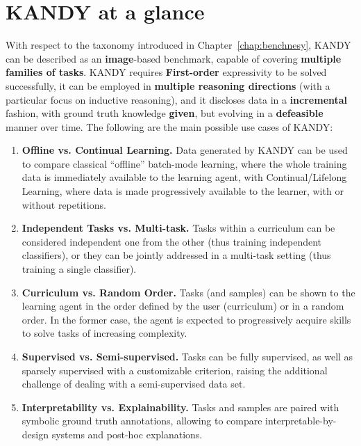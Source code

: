 \section{\textsc{KANDY} at a glance}
With respect to the taxonomy introduced in Chapter~\ref{chap:benchnesy}, \textsc{KANDY} can be described as an \textbf{image}-based benchmark, capable of covering \textbf{multiple families of tasks}. \textsc{KANDY} requires \textbf{First-order} expressivity to be solved successfully, it can be employed in \textbf{multiple reasoning directions} (with a particular focus on inductive reasoning), and it discloses data in a \textbf{incremental} fashion, with ground truth knowledge \textbf{given}, but evolving in a \textbf{defeasible} manner over time. 
The following are the main possible use cases of \textsc{KANDY}:
%
\begin{enumerate}
    \item \textbf{Offline vs. Continual Learning.} Data generated by \textsc{KANDY} can be used to compare classical ``offline'' batch-mode learning, where the whole training data is immediately available to the learning agent, with Continual/Lifelong Learning, where data is made progressively available to the learner, with or without repetitions.
    \item \textbf{Independent Tasks vs. Multi-task.} Tasks within a curriculum can be considered independent one from the other (thus training independent classifiers), or they can be jointly addressed in a multi-task setting (thus training a single classifier).%
    \item \textbf{Curriculum vs. Random Order.} Tasks (and samples) can be shown to the learning agent in the order defined by the user (curriculum) or in a random order. In the former case, the agent is expected to progressively acquire skills to solve tasks of increasing complexity.
    \item \textbf{Supervised vs. Semi-supervised.} Tasks can be fully supervised, as well as sparsely supervised with a customizable criterion, raising the additional challenge of dealing with a semi-supervised data set.
    \item \textbf{Interpretability vs. Explainability.} Tasks and samples are paired with symbolic ground truth annotations, allowing to compare interpretable-by-design systems and post-hoc explanations.
\end{enumerate}


